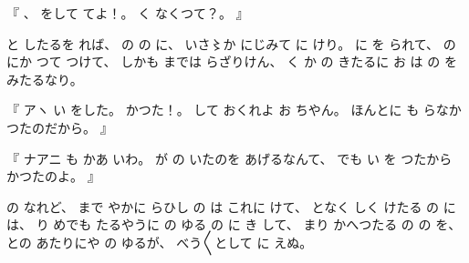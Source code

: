 %
『
、
%
をして
てよ！。
%
く
なくつて？。
』

%
と
したるを
れば、
%
の
の
に、
%
いさ〻か%
にじみて
に
けり。
%
に
を%
られて、
%
の
にか
つて
つけて、
%
しかも
までは
らざりけん、
%
く
か%
の
きたるに
お
は
の
を
みたるなり。

%
『
アヽ
い
をした。
%
かつた！。
%
して%
おくれよ
お
ちやん。
%
ほんとに
も
らなかつたのだから。
』

%
『
ナアニ
も
かあ
いわ。
%
が
の
いたのを
あげるなんて、
%
でも
い
を
つたから
かつたのよ。
』

%
の%
なれど、
%
まで
やかに
らひし
の
は
これに
けて、
%
となく
しく
けたる
の
には、
%
り
めでも
たるやうに
の
ゆる
の
に
き%
して、
%
まり
かへつたる
の
の
を、
%
との
あたりにや
の
ゆるが、
%
べう〳〵として
に
えぬ。
